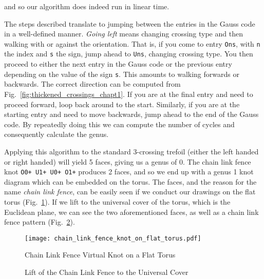         and so our algorithm does indeed run in linear time.
        \par\hfill\par
        The steps described translate to jumping between the entries in the
        Gauss code in a well-defined manner. \textit{Going left} means changing
        crossing type and then walking with or against the orientation.
        That is, if you come to entry \texttt{Ons}, with \texttt{n} the index
        and \texttt{s} the sign, jump ahead to \texttt{Uns}, changing crossing
        type. You then proceed to either the next entry in the Gauss code or
        the previous entry depending on the value of the sign \texttt{s}.
        This amounts to walking forwards or backwards. The correct direction
        can be computed from Fig.~\ref{fig:thickened_crossings_chapt1}.
        If you are at the final entry and need to proceed forward,
        loop back around to the
        start. Similarly, if you are at the starting entry and need to move
        backwards, jump ahead to the end of the Gauss code. By repeatedly
        doing this we can compute the number of cycles and consequently
        calculate the genus.
        \par\hfill\par
        Applying this algorithm to the standard 3-crossing trefoil (either the
        left handed or right handed) will yield 5 faces, giving us a genus of
        0. The chain link fence knot \texttt{O0+ U1+ U0+ O1+} produces 2 faces,
        and so we end up with a genus 1 knot diagram which can be embedded on
        the torus. The faces, and the reason for the name
        \textit{chain link fence}, can be easily seen if we conduct our drawings
        on the flat torus (Fig.~\ref{fig:chain_link_fence_knot_on_flat_torus}).
        If we lift to the universal cover of the torus, which is the Euclidean
        plane, we can see the two aforementioned faces, as well as a chain
        link fence pattern
        (Fig.~\ref{fig:chain_link_fence_knot_on_flat_torus_universal_cover}).
        \begin{figure}
            \centering
            \texttt{[image: chain\_link\_fence\_knot\_on\_flat\_torus.pdf]}
            \caption{Chain Link Fence Virtual Knot on a Flat Torus}
            \label{fig:chain_link_fence_knot_on_flat_torus}
        \end{figure}
        \begin{figure}
            \centering
            \caption{Lift of the Chain Link Fence to the Universal Cover}
            \label{fig:chain_link_fence_knot_on_flat_torus_universal_cover}
        \end{figure}
